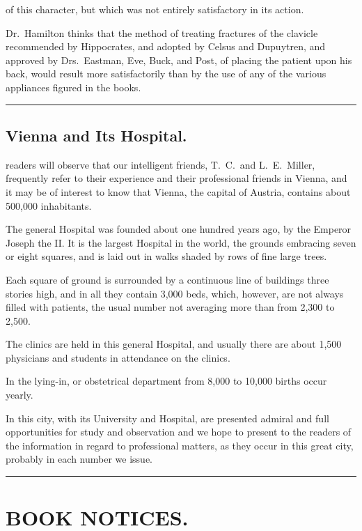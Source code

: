 of this character, but which was not entirely satisfactory in its
action.

Dr.\ Hamilton thinks that the method of treating fractures of the clavicle
recommended by Hippocrates, and adopted by Celsus and Dupuytren,
and approved by Drs.~Eastman, Eve, Buck, and Post, of placing the
patient upon his back, would result more satisfactorily than by the use
of any of the various appliances figured in the books.

\fancybreak{*}

\section*{Vienna and Its Hospital.}

 readers will observe that our intelligent friends,  T.~C.\ and
L.~E.\ Miller, frequently refer to their experience and their professional
friends in Vienna, and it may be of interest to know that Vienna, the
capital of Austria, contains about 500,000 inhabitants.

The general Hospital was founded about one hundred years ago, by
the Emperor Joseph the II. It is the largest Hospital in the world,
the grounds embracing seven or eight squares, and is laid out in walks
shaded by rows of fine large trees.

Each square of ground is surrounded by a continuous line of buildings
three stories high, and in all they contain 3,000 beds, which, however,
are not always filled with patients, the usual number not averaging
more than from 2,300 to 2,500.

The clinics are held in this general Hospital, and usually there are
about 1,500 physicians and students in attendance on the clinics.

In the lying-in, or obstetrical department from 8,000 to 10,000 births
occur yearly.

In this city, with its University and Hospital, are presented admiral
and full opportunities for study and observation and we hope to present
to the readers of the  information in regard to
professional matters, as they occur in this great city, probably in each
number we issue.

\fancybreak{*}

\chapter*[Book Notices.]{BOOK NOTICES.}

